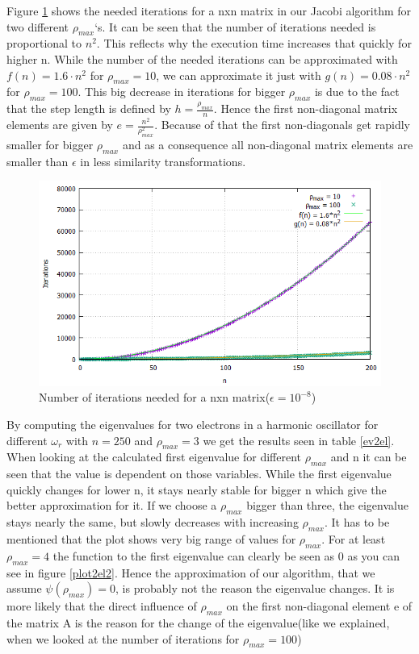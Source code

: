 \documentclass[10pt,a4paper]{article}
\begin{document}
Figure \ref{plotiterations} shows the needed iterations for a nxn matrix in our Jacobi algorithm for two different $\rho_{max}$`s. It can be seen that the number of iterations needed is proportional to $n^{2}$. This reflects why the execution time increases that quickly for higher n. While the number of the needed iterations can be approximated with $f(n) = 1.6 \cdot n^2$ for  $\rho_{max} = 10$, we can approximate it just with $g(n) = 0.08 \cdot n^2$ for  $\rho_{max} = 100$. This big decrease in iterations for bigger $\rho_{max}$ is due to the fact that the step length is defined by $h = \frac{\rho_{max}}{n}$. Hence the first non-diagonal matrix elements are given by $e = \frac{n^2}{\rho_{max}^2}$. Because of that the first non-diagonals get rapidly smaller for bigger $\rho_{max}$ and as a consequence all non-diagonal matrix elements are smaller than $\epsilon$ in less similarity transformations. 

\begin{figure}[h]
	\includegraphics[scale = 0.45]{iterations_comparison_notitle.png}
	\centering
	\caption{Number of iterations needed for a nxn matrix($\epsilon = 10^{-8}$)}
	\label{plotiterations}
\end{figure}

By computing the eigenvalues for two electrons in a harmonic oscillator for different $\omega_{r}$ with $n = 250$ and $\rho_{max} = 3$ we get the results seen in table \ref{ev2el}. When looking at the calculated first eigenvalue for different $\rho_{max}$ and n it can be seen that the value is dependent on those variables. While the first eigenvalue quickly changes for lower n, it stays nearly stable for bigger n which give the better approximation for it. If we choose a $\rho_{max}$ bigger than three, the eigenvalue stays nearly the same, but slowly decreases with increasing $\rho_{max}$. It has to be mentioned that the plot shows very big range of values for $\rho_{max}$. For at least $\rho_{max} = 4$ the function to the first eigenvalue can clearly be seen as 0 as you can see in figure \ref{plot2el2}. Hence the approximation of our algorithm, that we assume $\psi(\rho_{max}) = 0$, is probably not the reason the eigenvalue changes. It is more likely that the direct influence of $\rho_{max}$ on the first non-diagonal element e of the matrix A is the reason for the change of the eigenvalue(like we explained, when we looked at the number of iterations for $\rho_{max} = 100$)
\end{document}
